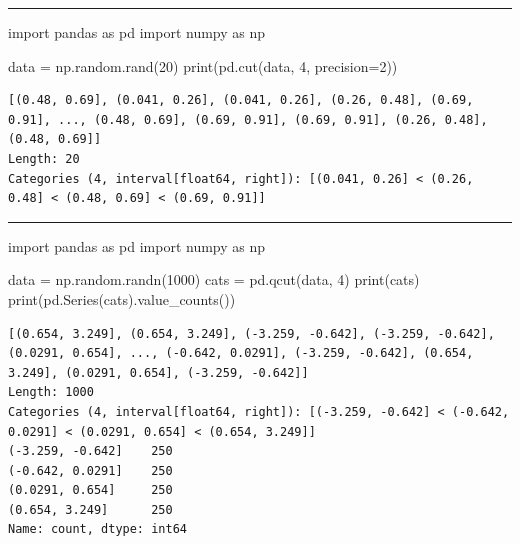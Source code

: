 \documentclass[
  polish,
  letterpaper,
  DIV=11,
  numbers=noendperiod]{scrreprt}
\newenvironment{Shaded}{\begin{snugshade}}{\end{snugshade}}
\newcommand{\BuiltInTok}[1]{\textcolor[rgb]{0.00,0.23,0.31}{#1}}
\newcommand{\DecValTok}[1]{\textcolor[rgb]{0.68,0.00,0.00}{#1}}
\newcommand{\ImportTok}[1]{\textcolor[rgb]{0.00,0.46,0.62}{#1}}
\newcommand{\NormalTok}[1]{\textcolor[rgb]{0.00,0.23,0.31}{#1}}
\newcommand{\OperatorTok}[1]{\textcolor[rgb]{0.37,0.37,0.37}{#1}}
\begin{document}
\begin{center}\rule{0.5\linewidth}{0.5pt}\end{center}

\begin{Shaded}
\begin{Highlighting}[]
\ImportTok{import}\NormalTok{ pandas }\ImportTok{as}\NormalTok{ pd}
\ImportTok{import}\NormalTok{ numpy }\ImportTok{as}\NormalTok{ np}

\NormalTok{data }\OperatorTok{=}\NormalTok{ np.random.rand(}\DecValTok{20}\NormalTok{)}
\BuiltInTok{print}\NormalTok{(pd.cut(data, }\DecValTok{4}\NormalTok{, precision}\OperatorTok{=}\DecValTok{2}\NormalTok{))}
\end{Highlighting}
\end{Shaded}

\begin{verbatim}
[(0.48, 0.69], (0.041, 0.26], (0.041, 0.26], (0.26, 0.48], (0.69, 0.91], ..., (0.48, 0.69], (0.69, 0.91], (0.69, 0.91], (0.26, 0.48], (0.48, 0.69]]
Length: 20
Categories (4, interval[float64, right]): [(0.041, 0.26] < (0.26, 0.48] < (0.48, 0.69] < (0.69, 0.91]]
\end{verbatim}

\begin{center}\rule{0.5\linewidth}{0.5pt}\end{center}

\begin{Shaded}
\begin{Highlighting}[]
\ImportTok{import}\NormalTok{ pandas }\ImportTok{as}\NormalTok{ pd}
\ImportTok{import}\NormalTok{ numpy }\ImportTok{as}\NormalTok{ np}

\NormalTok{data }\OperatorTok{=}\NormalTok{ np.random.randn(}\DecValTok{1000}\NormalTok{)}
\NormalTok{cats }\OperatorTok{=}\NormalTok{ pd.qcut(data, }\DecValTok{4}\NormalTok{)}
\BuiltInTok{print}\NormalTok{(cats)}
\BuiltInTok{print}\NormalTok{(pd.Series(cats).value\_counts())}
\end{Highlighting}
\end{Shaded}

\begin{verbatim}
[(0.654, 3.249], (0.654, 3.249], (-3.259, -0.642], (-3.259, -0.642], (0.0291, 0.654], ..., (-0.642, 0.0291], (-3.259, -0.642], (0.654, 3.249], (0.0291, 0.654], (-3.259, -0.642]]
Length: 1000
Categories (4, interval[float64, right]): [(-3.259, -0.642] < (-0.642, 0.0291] < (0.0291, 0.654] < (0.654, 3.249]]
(-3.259, -0.642]    250
(-0.642, 0.0291]    250
(0.0291, 0.654]     250
(0.654, 3.249]      250
Name: count, dtype: int64
\end{verbatim}
\end{document}
